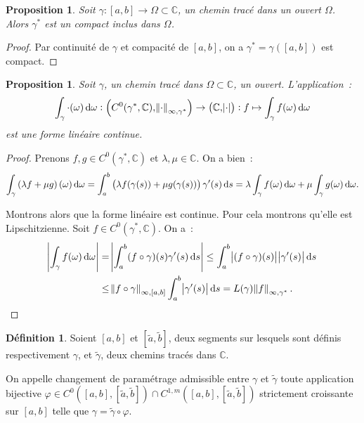 \documentclass{report}
\newtheorem{prp}[thm]{Proposition}
\theoremstyle{definition}
\newtheorem{déf}[thm]{Définition}
\theoremstyle{remark}
\numberwithin{equation}{section}
\newcommand{\C}{\mathbb C}
\begin{document}
			\begin{prp} Soit $\gamma : [a, b] \to \Omega \subset \C$, un chemin tracé dans un ouvert $\Omega$. Alors $\gamma^*$ est un compact inclus dans $\Omega$.
			\end{prp}

			\begin{proof} Par continuité de $\gamma$ et compacité de $[a, b]$, on a $\gamma^* = \gamma([a, b])$ est compact.
			\end{proof}

			\begin{prp} Soit $\gamma$, un chemin tracé dans $\Omega \subset \C$, un ouvert. L'application~:
			\begin{equation}
				\int_\gamma \cdot(\omega) \dif \omega : \left(C^0(\gamma^*, \C), \norm \cdot_{\infty, \gamma^*}\right) \to \left(\C, \abs \cdot\right) : f \mapsto \int_\gamma f(\omega)\dif \omega
			\end{equation}
			est une forme linéaire continue.
			\end{prp}

			\begin{proof} Prenons $f, g \in C^0(\gamma^*, \C)$ et $\lambda, \mu \in \C$. On a bien~:
			\begin{equation}
				\int_\gamma \left(\lambda f + \mu g\right)(\omega)\dif \omega = \int_a^b \left(\lambda f(\gamma(s)) + \mu g(\gamma(s))\right)\gamma'(s)\dif s
					= \lambda \int_\gamma f(\omega)\dif \omega + \mu \int_\gamma g(\omega)\dif \omega.
			\end{equation}

			Montrons alors que la forme linéaire est continue. Pour cela montrons qu'elle est Lipschitzienne. Soit $f \in C^0(\gamma^*, \C)$. On a~:
			\begin{align}
				\abs {\int_\gamma f(\omega)\dif \omega} &= \abs {\int_a^b (f \circ \gamma)(s)\gamma'(s)\dif s}
					\leq \int_a^b\abs {(f \circ \gamma)(s)}\abs {\gamma'(s)}\dif s \\
				&\leq \norm {f \circ \gamma}_{\infty, [a, b]} \int_a^b\abs {\gamma'(s)}\dif s = L(\gamma)\norm f_{\infty, \gamma^*}.
			\end{align}
			\end{proof}

			\begin{déf} Soient $[a, b]$ et $[\tilde a, \tilde b]$, deux segments sur lesquels sont définis respectivement $\gamma$, et $\tilde \gamma$, deux
			chemins tracés dans $\C$.

			On appelle changement de paramétrage admissible entre $\gamma$ et $\tilde \gamma$ toute application bijective
			$\varphi \in C^0([a, b], [\tilde a, \tilde b]) \cap C^{1,m}([a, b], [\tilde a, \tilde b])$ strictement croissante sur $[a, b]$ telle que
			$\gamma = \tilde \gamma \circ \varphi$.
			\end{déf}
\end{document}
